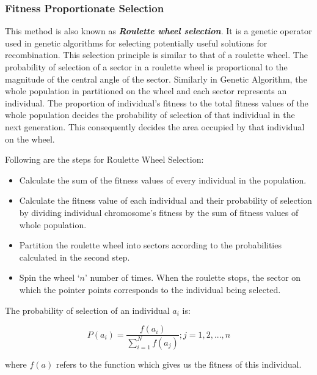 \documentclass[a4paper, 12pt]{article}
\begin{document}
\subsubsection{Fitness Proportionate Selection}
This method is also known as \textbf{\textit{Roulette wheel selection}}. It is a genetic operator used in genetic algorithms for selecting potentially useful 
solutions for recombination. This selection principle is similar to that of a roulette wheel. The probability of selection of a sector in a 
roulette wheel is proportional to the magnitude of the central angle of the sector. Similarly in Genetic Algorithm, the whole population in
partitioned on the wheel and each sector represents an individual. The proportion of individual’s fitness to the total fitness values of the 
 whole population decides the probability of selection of that individual in the next generation. This consequently decides the area occupied 
by that individual on the wheel.\par
\noindent
Following are the steps for Roulette Wheel Selection:
\begin{itemize}
\item Calculate the sum of the fitness values of every individual in the population.
\item Calculate the fitness value of each individual and their probability of selection by dividing individual chromosome’s fitness by the sum 
of fitness values of whole population.
\item Partition the roulette wheel into sectors according to the probabilities calculated in the second step.
\item Spin the wheel ‘$n$’ number of times. When the roulette stops, the sector on which the pointer points corresponds to the individual being selected.
\end{itemize}
The probability of selection of an individual $a_i$ is:
\begin{large}
\boldmath\begin{equation*}
P\left(a_{i}\right) = \frac{f\left(a_{i}\right)}{\sum_{i=1}^{N}f\left(a_j\right)}; j=1,2,...,n 
\end{equation*}
\end{large}
where \boldmath$f\left(a\right)$ refers to the function which gives us the fitness of this individual.
\end{document}
